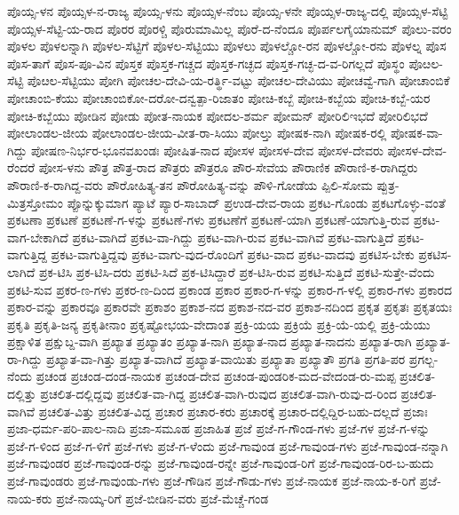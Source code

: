 ಪೊಯ್ಸ-ಳನ
ಪೊಯ್ಸಳ-ನ-ರಾಜ್ಯ
ಪೊಯ್ಸ-ಳನು
ಪೊಯ್ಸಳ-ನೆಂಬ
ಪೊಯ್ಸ-ಳನೇ
ಪೊಯ್ಸಳ-ರಾಜ್ಯ-ದಲ್ಲಿ
ಪೊಯ್ಸಳ-ಸೆಟ್ಟಿ
ಪೊಯ್ಸಳ-ಸೆಟ್ಟಿ-ಯ-ರಾದ
ಪೊರರ
ಪೊರಳ್ಚಿ
ಪೊರುಮಾಮಿಲ್ಲ
ಪೊರೆ-ದ-ನೆಂದೂ
ಪೊರ್ಪಲಗೈಯಾನುಮ್
ಪೊಲು-ವರಂ
ಪೊಳಲ
ಪೊಳಲನ್ನಾಗಿ
ಪೊಳಲ-ಸೆಟ್ಟಿಗೆ
ಪೊಳಲ-ಸೆಟ್ಟಿಯು
ಪೊಳಲು
ಪೊಳಲ್ಚೋ-ರನ
ಪೊಳಲ್ಚೋ-ರನು
ಪೊಳಲ್ನ
ಪೊಸ
ಪೊಸ-ತಾಗೆ
ಪೊಸ-ಪೂ-ವಿನ
ಪೊಸ್ತಕ
ಪೊಸ್ತಕ-ಗಚ್ಚದ
ಪೊಸ್ತಕ-ಗಚ್ಛದ
ಪೊಸ್ತಕ-ಗಚ್ಛ-ದ-ವ-ರಿಗಲ್ಲದೆ
ಪೊಸ್ಥಂ
ಪೊೞಲ-ಸೆಟ್ಟಿ
ಪೊೞಲ-ಸೆಟ್ಟಿಯು
ಪೋಗಿ
ಪೋಚಲ-ದೇವಿ-ಯ-ರರ್ತ್ಥಿ-ವಟ್ಟು
ಪೋಚಲ-ದೇವಿಯು
ಪೋಚವ್ವೆ-ಗಾಗಿ
ಪೋಚಾಂಬಿಕೆ
ಪೋಚಾಂಬಿ-ಕೆಯು
ಪೋಚಾಂಬಿಕೋ-ದರೋ-ದನ್ವತ್ಪಾ-ರಿಜಾತಂ
ಪೋಚಿ-ಕಬ್ಬೆ
ಪೋಚಿ-ಕಬ್ಬೆಯ
ಪೋಚಿ-ಕಬ್ಬೆ-ಯರ
ಪೋಚಿ-ಕಬ್ಬೆಯು
ಪೋಡಿನ
ಪೋಡು
ಪೋತ-ನಾಯಕ
ಪೋದಲ-ಶರ್ಮ
ಪೋಮನ್
ಪೋರಿಲಿಇಭದೆ
ಪೋರಿಲಿಭದೆ
ಪೋಲಾಂಡಲ-ಜೀಯ
ಪೋಲಾಂಡಲ-ಜೀಯ-ವೀತ-ರಾ-ಸಿಯು
ಪೋಲ್ತು
ಪೋಷಕ-ನಾಗಿ
ಪೋಷಕ-ರಲ್ಲಿ
ಪೋಷಕ-ವಾ-ಗಿದ್ದು
ಪೋಷಣ-ನಿರ್ಭರ-ಭೂನವಖಂಡಃ
ಪೋಷಿತ-ನಾದ
ಪೋಸಳ
ಪೋಸಳ-ದೇವ
ಪೋಸಳ-ದೇವರು
ಪೋಸಳ-ದೇವ-ರೆಂದರೆ
ಪೋಸ-ಳನು
ಪೌತ್ರ
ಪೌತ್ರ-ರಾದ
ಪೌತ್ರರು
ಪೌತ್ರರೂ
ಪೌರ-ಸೇವೆಯ
ಪೌರಾಣಿಕ
ಪೌರಾಣಿ-ಕ-ರಾಗಿದ್ದರು
ಪೌರಾಣಿ-ಕ-ರಾಗಿದ್ದ-ವರು
ಪೌರೋಹಿತ್ಯ-ತನ
ಪೌರೋಹಿತ್ಯ-ವನ್ನು
ಪೌಳಿ-ಗೋಡೆಯ
ಪ್ಪಿಲಿ-ಸೋಮ
ಪ್ಪುತ್ರ-ಮಿತ್ರಸ್ತೋಮಂ
ಪ್ಪೊನ್ನುಕ್ಕುಮಾಗ
ಪ್ಯಾಟೆ
ಪ್ಯಾರ-ಸಾಬಾದ್
ಪ್ರಉಡ-ದೇವ-ರಾಯ
ಪ್ರಕಟ-ಗೊಂಡು
ಪ್ರಕಟಗೊಳ್ಳು-ವಂತೆ
ಪ್ರಕಟಣಾ
ಪ್ರಕಟಣೆ
ಪ್ರಕಟಣೆ-ಗ-ಳನ್ನು
ಪ್ರಕಟಣೆ-ಗಳು
ಪ್ರಕಟಣೆಗೆ
ಪ್ರಕಟಣೆ-ಯಾಗಿ
ಪ್ರಕಟಣೆ-ಯಾಗುತ್ತಿ-ರುವ
ಪ್ರಕಟ-ವಾಗ-ಬೇಕಾಗಿದೆ
ಪ್ರಕಟ-ವಾಗಿದೆ
ಪ್ರಕಟ-ವಾ-ಗಿದ್ದು
ಪ್ರಕಟ-ವಾಗಿ-ರುವ
ಪ್ರಕಟ-ವಾಗಿವೆ
ಪ್ರಕಟ-ವಾಗುತ್ತಿದೆ
ಪ್ರಕಟ-ವಾಗುತ್ತಿದ್ದ
ಪ್ರಕಟ-ವಾಗುತ್ತಿದ್ದವು
ಪ್ರಕಟ-ವಾಗು-ವುದ-ರೊಂದಿಗೆ
ಪ್ರಕಟ-ವಾದ
ಪ್ರಕಟ-ವಾದವು
ಪ್ರಕಟಿಸ-ಬೇಕು
ಪ್ರಕಟಿಸ-ಲಾಗಿದೆ
ಪ್ರಕ-ಟಿಸಿ
ಪ್ರಕ-ಟಿಸಿ-ದರು
ಪ್ರಕಟಿ-ಸಿದೆ
ಪ್ರಕ-ಟಿಸಿದ್ದಾರೆ
ಪ್ರಕ-ಟಿಸಿ-ರುವ
ಪ್ರಕಟಿ-ಸುತ್ತಿದೆ
ಪ್ರಕಟಿ-ಸುತ್ತೇ-ವೆಂದು
ಪ್ರಕಟಿ-ಸುವ
ಪ್ರಕರ-ಣ-ಗಳು
ಪ್ರಕರ-ಣ-ದಿಂದ
ಪ್ರಕಾಂಡ
ಪ್ರಕಾರ
ಪ್ರಕಾರ-ಗ-ಳನ್ನು
ಪ್ರಕಾರ-ಗ-ಳಲ್ಲಿ
ಪ್ರಕಾರ-ಗಳು
ಪ್ರಕಾರದ
ಪ್ರಕಾರ-ವನ್ನು
ಪ್ರಕಾರವೂ
ಪ್ರಕಾರವೇ
ಪ್ರಕಾಶಂ
ಪ್ರಕಾಶ-ನದ
ಪ್ರಕಾಶ-ನದ-ವರ
ಪ್ರಕಾಶ-ನದಿಂದ
ಪ್ರಕೃತ
ಪ್ರಕೃತಃ
ಪ್ರಕೃತಯಃ
ಪ್ರಕೃತಿ
ಪ್ರಕೃತಿ-ಜನ್ಯ
ಪ್ರಕೃತೀನಾಂ
ಪ್ರಕೃಷ್ಟೋಭಯ-ವೇದಾಂತ
ಪ್ರಕ್ರಿ-ಯಯ
ಪ್ರಕ್ರಿಯೆ
ಪ್ರಕ್ರಿ-ಯೆ-ಯಲ್ಲಿ
ಪ್ರಕ್ರಿ-ಯೆಯು
ಪ್ರಕ್ಷಾಳಿತ
ಪ್ರಕ್ಷುಬ್ದ-ವಾಗಿ
ಪ್ರಖ್ಯಾತ
ಪ್ರಖ್ಯಾತಂ
ಪ್ರಖ್ಯಾತ-ನಾಗಿ
ಪ್ರಖ್ಯಾತ-ನಾದ
ಪ್ರಖ್ಯಾತ-ನಾದನು
ಪ್ರಖ್ಯಾತ-ರಾಗಿ
ಪ್ರಖ್ಯಾತ-ರಾ-ಗಿದ್ದು
ಪ್ರಖ್ಯಾತ-ವಾ-ಗಿತ್ತು
ಪ್ರಖ್ಯಾತ-ವಾಗಿದೆ
ಪ್ರಖ್ಯಾತ-ವಾಯಿತು
ಪ್ರಖ್ಯಾತಾ
ಪ್ರಖ್ಯಾತೌ
ಪ್ರಗತಿ
ಪ್ರಗತಿ-ಪರ
ಪ್ರಗಲ್ಬ-ನೆಂದು
ಪ್ರಚಂಡ
ಪ್ರಚಂಡ-ದಂಡ-ನಾಯಕ
ಪ್ರಚಂಡ-ದೇವ
ಪ್ರಚಂಡ-ಪುಂಡರಿಕ-ಮದ-ವೇದಂಡ-ರು-ಮಪ್ಪ
ಪ್ರಚಲಿತ-ದಲ್ಲಿತ್ತು
ಪ್ರಚಲಿತ-ದಲ್ಲಿದ್ದವು
ಪ್ರಚಲಿತ-ವಾ-ಗಿದ್ದ
ಪ್ರಚಲಿತ-ವಾಗಿ-ರುವುದ
ಪ್ರಚಲಿತ-ವಾಗಿ-ರುವು-ದ-ರಿಂದ
ಪ್ರಚಲಿತ-ವಾಗಿವೆ
ಪ್ರಚಲಿತ-ವಿತ್ತು
ಪ್ರಚಲಿತ-ವಿದ್ದ
ಪ್ರಚಾರ
ಪ್ರಚಾರ-ಕರು
ಪ್ರಚಾರಕ್ಕೆ
ಪ್ರಚಾರ-ದಲ್ಲಿದ್ದಿರ-ಬಹು-ದಲ್ಲದೆ
ಪ್ರಜಾಃ
ಪ್ರಜಾ-ಧರ್ಮ-ಪರಿ-ಪಾಲ-ನಾದಿ
ಪ್ರಜಾ-ಸಮೂಹ
ಪ್ರಜಾಹಿತ
ಪ್ರಜೆ
ಪ್ರಜೆ-ಗ-ಗೌಂಡ-ಗಳು
ಪ್ರಜೆ-ಗಳ
ಪ್ರಜೆ-ಗ-ಳನ್ನು
ಪ್ರಜೆ-ಗ-ಳಿಂದ
ಪ್ರಜೆ-ಗ-ಳಿಗೆ
ಪ್ರಜೆ-ಗಳು
ಪ್ರಜೆ-ಗ-ಳೆಂದು
ಪ್ರಜೆ-ಗಾವುಂಡ
ಪ್ರಜೆ-ಗಾವುಂಡ-ಗಳು
ಪ್ರಜೆ-ಗಾವುಂಡ-ನನ್ನಾಗಿ
ಪ್ರಜೆ-ಗಾವುಂಡರ
ಪ್ರಜೆ-ಗಾವುಂಡ-ರನ್ನು
ಪ್ರಜೆ-ಗಾವುಂಡ-ರನ್ನೇ
ಪ್ರಜೆ-ಗಾವುಂಡ-ರಿಗೆ
ಪ್ರಜೆ-ಗಾವುಂಡ-ರಿರ-ಬ-ಹುದು
ಪ್ರಜೆ-ಗಾವುಂಡರು
ಪ್ರಜೆ-ಗಾವುಂಡು-ಗಳು
ಪ್ರಜೆ-ಗೌಡಿನ
ಪ್ರಜೆ-ಗೌಡು-ಗಳು
ಪ್ರಜೆ-ನಾಯಕ
ಪ್ರಜೆ-ನಾಯ-ಕ-ರಿಗೆ
ಪ್ರಜೆ-ನಾಯ-ಕರು
ಪ್ರಜೆ-ನಾಯ್ಕ-ರಿಗೆ
ಪ್ರಜೆ-ಬೀಡಿನ-ವರು
ಪ್ರಜೆ-ಮೆಚ್ಚೆ-ಗಂಡ
